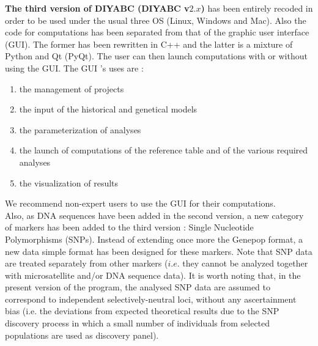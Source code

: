 \documentclass [a4paper]{report}
\begin{document}
 \textbf{The third version of DIYABC (DIYABC v$2.x$)}  has been entirely recoded in order to be used under the usual three OS (Linux, Windows and Mac). Also the code for computations has been separated from that of the graphic user interface (GUI). The former has been rewritten in C++ and the latter is a mixture of Python and Qt (PyQt). The user can then launch computations with or without using the GUI. The GUI 's uses are : 

\begin{enumerate}
\item the management of projects
\item the input of the historical and genetical models
\item the parameterization of analyses
\item the launch of computations  of the reference table and of the various required analyses
\item the visualization of results
\end{enumerate}

We recommend non-expert users to use the GUI for their computations.\\

Also, as DNA sequences have been added in the second version, a new category of markers has been added to the third version : Single Nucleotide Polymorphisms (SNPs). Instead of extending once more the Genepop format, a new data simple format has been designed for these markers. Note that SNP data are treated separately from other markers ($i.e.$ they cannot be analyzed together with microsatellite and/or DNA sequence data). It is worth noting that, in the present version of the program, the analysed SNP data are assumed to correspond to independent selectively-neutral loci, without any ascertainment bias (i.e. the deviations from expected theoretical results due to the SNP discovery process in which a small number of individuals from selected populations are used as discovery panel). \\  
\end{document}
